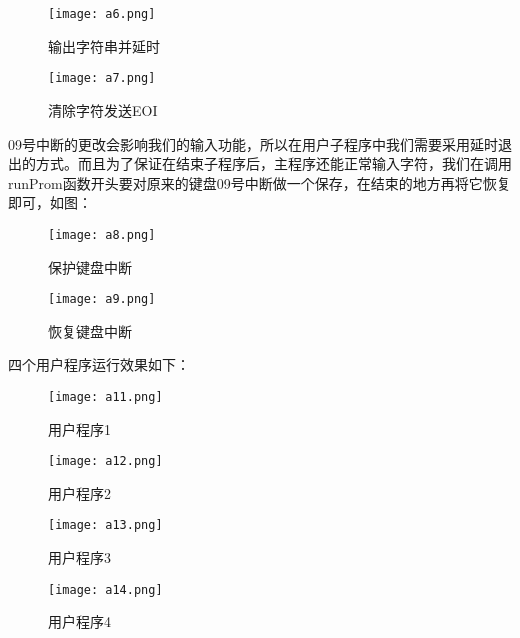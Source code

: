 \documentclass[UTF8]{article}
\begin{document}
\begin{enumerate}[1)]
		\begin{figure}[htbp]
			\begin{minipage}[t]{0.5\linewidth}
			\centering
			\texttt{[image: a6.png]}
			\caption{输出字符串并延时}
			\end{minipage}
			\begin{minipage}[t]{0.5\linewidth}
				\centering
			\texttt{[image: a7.png]}
			\caption{清除字符发送EOI}
			\end{minipage}
		\end{figure}
09号中断的更改会影响我们的输入功能，所以在用户子程序中我们需要采用延时退出的方式。而且为了保证在结束子程序后，主程序还能正常输入字符，我们在调用runProm函数开头要对原来的键盘09号中断做一个保存，在结束的地方再将它恢复即可，如图：
\begin{figure}[htbp]
			\begin{minipage}[t]{0.5\linewidth}
			\centering
			\texttt{[image: a8.png]}
			\caption{保护键盘中断}
			\end{minipage}
			\begin{minipage}[t]{0.5\linewidth}
				\centering
			\texttt{[image: a9.png]}
			\caption{恢复键盘中断}
			\end{minipage}
		\end{figure}
\par 四个用户程序运行效果如下：
\newpage
\begin{figure}[htbp]
			\begin{minipage}[t]{0.5\linewidth}
			\centering
			\texttt{[image: a11.png]}
			\caption{用户程序1}
			\end{minipage}
			\begin{minipage}[t]{0.5\linewidth}
				\centering
			\texttt{[image: a12.png]}
			\caption{用户程序2}
			\end{minipage}
		\end{figure}
		\begin{figure}[htbp]
			\begin{minipage}[t]{0.5\linewidth}
			\centering
			\texttt{[image: a13.png]}
			\caption{用户程序3}
			\end{minipage}
			\begin{minipage}[t]{0.5\linewidth}
				\centering
			\texttt{[image: a14.png]}
			\caption{用户程序4}
			\end{minipage}
		\end{figure}
		

\end{enumerate}
\end{document}
